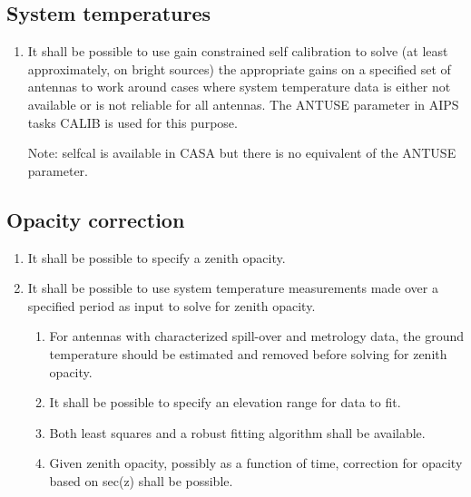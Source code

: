 \documentclass[11pt,a4paper]{article}
\begin{document}
\subsection{System temperatures}

\begin{enumerate}[subseclist]

  \item It shall be possible to use gain constrained self calibration
    to solve (at least approximately, on bright sources) the
    appropriate gains on a specified set of antennas to work around
    cases where system temperature data is either not available or is
    not reliable for all antennas. The ANTUSE parameter in AIPS tasks
    CALIB is used for this purpose.

    Note: selfcal is available in CASA but there is no equivalent of
    the ANTUSE parameter.

\end{enumerate}


\subsection{Opacity correction}

\begin{enumerate}[subseclist]

\item It shall be possible to specify a zenith opacity.

\item It shall be possible to use system temperature measurements made
  over a specified period as input to solve for zenith opacity.

  \begin{enumerate}[subsecsublist]

  \item For antennas with characterized spill-over and metrology data,
    the ground temperature should be estimated and removed before
    solving for zenith opacity.

  \item It shall be possible to specify an elevation range for data to
    fit.

  \item Both least squares and a robust fitting algorithm shall be available.

  \item Given zenith opacity, possibly as a function of time,
    correction for opacity based on sec(z) shall be possible.
    
  \end{enumerate}
  
\end{enumerate}
\end{document}

